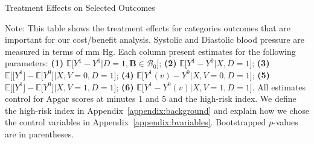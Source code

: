 \begin{table}[!htbp]
\centering
\begin{threeparttable}
\caption{Treatment Effects on Selected Outcomes}\label{table:tescombined}
\begin{scriptsize}

\end{scriptsize}
\begin{tablenotes}
\scriptsize
Note: This table shows the treatment effects for categories outcomes that are important for our cost/benefit analysis. Systolic and Diastolic blood pressure are measured in terms of mm Hg. Each column present estimates for the following parameters: \textbf{(1)} $\mathbb{E} \big[ Y^1 - Y^0 | D = 1, \bm{B} \in \mathcal{B}_0\big]$; {\textbf{(2)} $\mathbb{E} \big[ Y^1 - Y^0 |  X, D = 1 \big]$}; {\textbf{(3)} $\mathbb{E} \big[\big[ Y^1 \big] - \mathbb{E} \big[ Y^0 \big]| X, V =0, D =1 \big]$}; {\textbf{(4)} $\mathbb{E} \big[ Y^1(v) - Y^0 | X, V=0, D = 1 \big] $}; {\textbf{(5)} $\mathbb{E} \big[\big[ Y^1 \big] - \mathbb{E} \big[ Y^0 \big]| X, V=1, D =1 \big]$}; {\textbf{(6)} $\mathbb{E} \big[ Y^1 - Y^0(v) | X, V=1 , D = 1\big]$}. All estimates control for Apgar scores at minutes 1 and 5 and the high-risk index. We define the high-risk index in Appendix~\ref{appendix:background} and explain how we chose the control variables in Appendix~\ref{appendix:bvariables}. Bootstrapped $p$-values are in parentheses. 
\end{tablenotes}
\end{threeparttable}
\end{table}
\restoregeometry
\doublespacing

